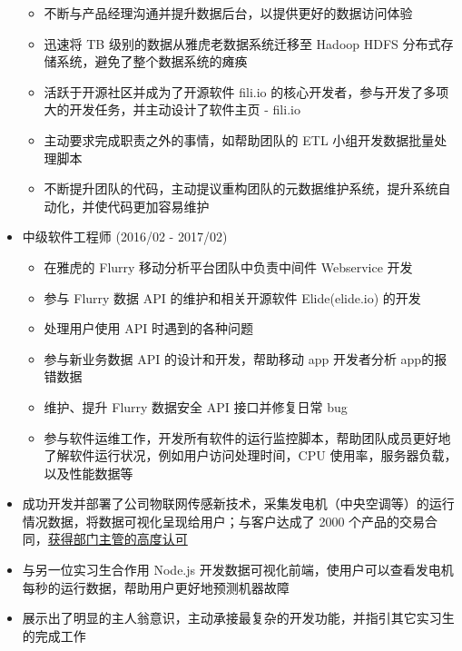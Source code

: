 \documentclass[10pt,a4paper,ragged2e,withhyper]{altacv}
\begin{document}
\begin{itemize}
\begin{itemize}
        \item 不断与产品经理沟通并提升数据后台，以提供更好的数据访问体验
        \item 迅速将 TB 级别的数据从雅虎老数据系统迁移至 Hadoop HDFS 分布式存储系统，避免了整个数据系统的瘫痪
        \item 活跃于开源社区并成为了开源软件 fili.io 的核心开发者，参与开发了多项大的开发任务，并主动设计了软件主页 - fili.io
        \item 主动要求完成职责之外的事情，如帮助团队的 ETL 小组开发数据批量处理脚本
        \item 不断提升团队的代码，主动提议重构团队的元数据维护系统，提升系统自动化，并使代码更加容易维护
    \end{itemize}
    \item 中级软件工程师 (2016/02 - 2017/02)
    \begin{itemize}
        \item 在雅虎的 Flurry 移动分析平台团队中负责中间件 Webservice 开发
        \item 参与 Flurry 数据 API 的维护和相关开源软件 Elide(elide.io) 的开发
        \item 处理用户使用 API 时遇到的各种问题
        \item 参与新业务数据 API 的设计和开发，帮助移动 app 开发者分析 app的报错数据
        \item 维护、提升 Flurry 数据安全 API 接口并修复日常 bug
        \item 参与软件运维工作，开发所有软件的运行监控脚本，帮助团队成员更好地了解软件运行状况，例如用户访问处理时间，CPU 使用率，服务器负载，以及性能数据等
    \end{itemize}
    \end{itemize}

    \divider

    \begin{itemize}
    \item 成功开发并部署了公司物联网传感新技术，采集发电机（中央空调等）的运行情况数据，将数据可视化呈现给用户；与客户达成了 2000 个产品的交易合同，\href{https://github.com/QubitPi/resume/blob/master/recommendation.png?raw=true}{获得部门主管的高度认可}
    \item 与另一位实习生合作用 Node.js 开发数据可视化前端，使用户可以查看发电机每秒的运行数据，帮助用户更好地预测机器故障
    \item 展示出了明显的主人翁意识，主动承接最复杂的开发功能，并指引其它实习生的完成工作
    \end{itemize}
\end{document}
